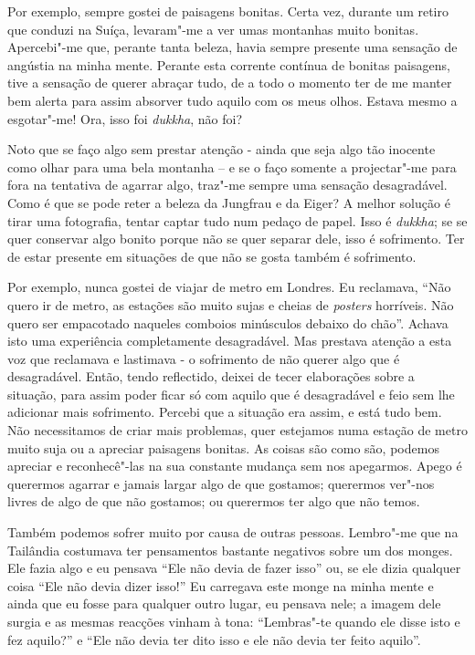 Por exemplo, sempre gostei de paisagens bonitas. Certa vez, durante um retiro
que conduzi na Suíça, levaram"-me a ver umas montanhas muito bonitas. Apercebi"-me
que, perante tanta beleza, havia sempre presente uma sensação de angústia na
minha mente. Perante esta corrente contínua de bonitas paisagens, tive a
sensação de querer abraçar tudo, de a todo o momento ter de me manter bem alerta
para assim absorver tudo aquilo com os meus olhos. Estava mesmo a esgotar"-me!
Ora, isso foi \emph{dukkha}, não foi?

\enlargethispage*{\baselineskip}

Noto que se faço algo sem prestar atenção - ainda que seja algo tão inocente
como olhar para uma bela montanha -- e se o faço somente a projectar"-me para fora
na tentativa de agarrar algo, traz"-me sempre uma sensação desagradável. Como é
que se pode reter a beleza da Jungfrau e da Eiger? A melhor solução é tirar uma
fotografia, tentar captar tudo num pedaço de papel. Isso é \emph{dukkha}; se se
quer conservar algo bonito porque não se quer separar dele, isso é sofrimento.
Ter de estar presente em situações de que não se gosta também é sofrimento.

Por exemplo, nunca gostei de viajar de metro em Londres. Eu reclamava, “Não
quero ir de metro, as estações são muito sujas e cheias de \emph{posters}
horríveis. Não quero ser empacotado naqueles comboios minúsculos debaixo do
chão”. Achava isto uma experiência completamente desagradável. Mas prestava
atenção a esta voz que reclamava e lastimava - o sofrimento de não querer algo
que é desagradável. Então, tendo reflectido, deixei de tecer elaborações sobre a
situação, para assim poder ficar só com aquilo que é desagradável e feio sem lhe
adicionar mais sofrimento. Percebi que a situação era assim, e está tudo bem.
Não necessitamos de criar mais problemas, quer estejamos numa estação de metro
muito suja ou a apreciar paisagens bonitas. As coisas são como são, podemos
apreciar e reconhecê"-las na sua constante mudança sem nos apegarmos. Apego é
querermos agarrar e jamais largar algo de que gostamos; querermos ver"-nos livres
de algo de que não gostamos; ou querermos ter algo que não temos.

Também podemos sofrer muito por causa de outras pessoas. Lembro"-me que na
Tailândia costumava ter pensamentos bastante negativos sobre um dos monges. Ele
fazia algo e eu pensava “Ele não devia de fazer isso” ou, se ele dizia qualquer
coisa “Ele não devia dizer isso!” Eu carregava este monge na minha mente e
ainda que eu fosse para qualquer outro lugar, eu pensava nele; a imagem dele
surgia e as mesmas reacções vinham à tona: “Lembras"-te quando ele disse isto e
fez aquilo?” e “Ele não devia ter dito isso e ele não devia ter feito aquilo”.

